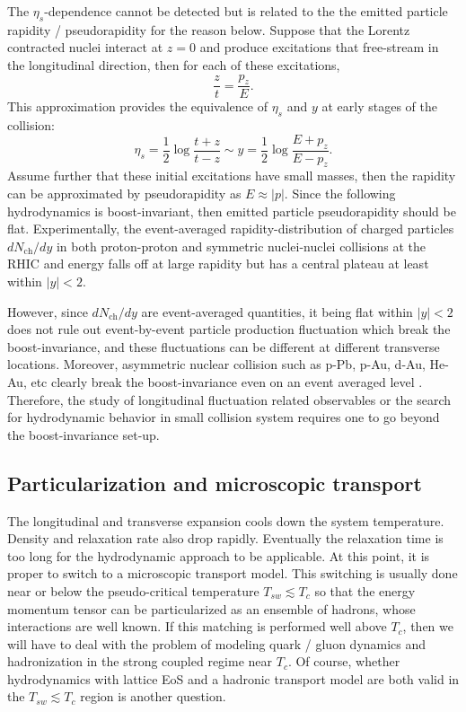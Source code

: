 The $\eta_s$-dependence cannot be detected but is related to the the emitted particle rapidity / pseudorapidity for the reason below.
Suppose that the Lorentz contracted nuclei interact at $z=0$ and produce excitations that free-stream in the longitudinal direction, then for each of these excitations,
\begin{equation}
  \frac{z}{t} = \frac{p_z}{E}.
\end{equation}
This approximation provides the equivalence of $\eta_s$ and $y$ at early stages of the collision:
\begin{equation}
  \eta_s = \frac{1}{2}\log\frac{t+z}{t-z} \sim y = \frac{1}{2}\log\frac{E+p_z}{E-p_z}.
\end{equation}
Assume further that these initial excitations have small masses, then the rapidity can be approximated by pseudorapidity as $E\approx |p|$.
Since the following hydrodynamics is boost-invariant, then emitted particle pseudorapidity should be flat.
Experimentally, the event-averaged rapidity-distribution of charged particles $dN_{\textrm{ch}}/dy$ in both proton-proton and symmetric nuclei-nuclei collisions at the RHIC and energy falls off at large rapidity but has a central plateau at least within $|y|<2$.

However, since $dN_{\textrm{ch}}/dy$ are event-averaged quantities, it being flat within $|y|<2$ does not rule out event-by-event particle production fluctuation which break the boost-invariance, and these fluctuations can be different at different transverse locations.
Moreover, asymmetric nuclear collision such as p-Pb, p-Au, d-Au, He-Au, etc clearly break the boost-invariance even on an event averaged level 
\cite{Abelev:2014mda, Aad:2014lta, Aad:2013fja, CMS:2012qk, Chatrchyan:2013nka, Khachatryan:2015waa, Khachatryan:2015oea, Khachatryan:2016ibd, Adare:2014keg, Adare:2015cpn, Adare:2018toe}.
Therefore, the study of longitudinal fluctuation related observables or the search for hydrodynamic behavior in small collision system requires one to go beyond the boost-invariance set-up.

\subsection{Particularization and microscopic transport}
The longitudinal and transverse expansion cools down the system temperature. 
Density and relaxation rate also drop rapidly.
Eventually the relaxation time is too long for the hydrodynamic approach to be applicable.
At this point, it is proper to switch to a microscopic transport model.
This switching is usually done near or below the pseudo-critical temperature $T_{sw} \lesssim T_c$ so that the energy momentum tensor can be particularized as an ensemble of hadrons, whose interactions are well known.
If this matching is performed well above $T_c$, then we will have to deal with the problem of modeling quark / gluon dynamics and hadronization in the strong coupled regime near $T_c$.
Of course, whether hydrodynamics with lattice EoS and a hadronic transport model are both valid in the $T_{sw} \lesssim T_c$ region is another question.

